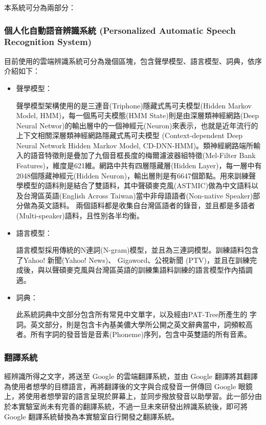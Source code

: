 本系統可分為兩部分：

\subsubsection{個人化自動語音辨識系統 (Personalized Automatic Speech Recognition System)} 
目前使用的雲端辨識系統可分為幾個區塊，包含聲學模型、語言模型、詞典，依序介紹如下：

\begin{itemize}

   \item 聲學模型：

聲學模型架構使用的是三連音(Triphone)隱藏式馬可夫模型(Hidden Markov Model, HMM)，每一個馬可夫模態(HMM State)則是由深層類神經網路(Deep Neural Networ)的輸出層中的一個神經元(Neuron)來表示，也就是近年流行的上下文相關深層類神經網路隱藏式馬可夫模型 (Context-dependent Deep Neural Network Hidden Markov Model,
CD-DNN-HMM)。類神經網路端所輸入的語音特徵則是疊加了九個音框長度的梅爾濾波器組特徵(Mel-Filter Bank Features)，維度是621維。網路中共有四層隱藏層(Hidden Layer)，每一層中有2048個隱藏神經元(Hidden Neuron)，輸出層則是有6647個節點。用來訓練聲學模型的語料則是結合了雙語料，其中聲碩麥克風(ASTMIC)做為中文語料以及台灣區英語(English Across Taiwan)當中非母語語者(Non-native Speaker)部分做為英文語料。
兩個語料都是收集自台灣區語者的錄音，並且都是多語者(Multi-speaker)語料，且性別各半均衡。

   \item 語言模型：

語言模型採用傳統的N連詞(N-gram)模型，並且為三連詞模型。訓練語料包含了Yahoo! 新聞(Yahoo! News)、 Gigaword、公視新聞 (PTV)，並且在訓練完成後，與以聲碩麥克風與台灣區英語的訓練集語料訓練的語言模型作內插調適。

   \item 詞典：

此系統詞典中文部分包含所有常見中文單字，以及經由PAT-Tree所產生的
字詞。英文部分，則是包含卡內基美儂大學所公開之英文辭典當中，詞頻較高者。所有字詞的發音皆是音素(Phoneme)序列，包含中英雙語的所有音素。

\end{itemize}

\subsubsection{翻譯系統}

經辨識所得之文字，將送至 Google 的雲端翻譯系統，並由 Google 翻譯將其翻譯為使用者想學的目標語言，再將翻譯後的文字與合成發音一併傳回    Google 眼鏡上，將使用者想學習的語言呈現於屏幕上，並同步撥放發音以助學習。此一部分由於本實驗室尚未有完善的翻譯系統，不過一旦未來研發出辨識系統後，即可將 Google 翻譯系統替換為本實驗室自行開發之翻譯系統。

